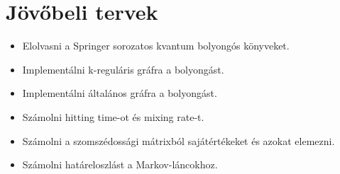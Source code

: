 \chapter{Jövőbeli tervek}

\begin{itemize}
  \item Elolvasni a Springer sorozatos kvantum bolyongós könyveket.
  \item Implementálni k-reguláris gráfra a bolyongást.
  \item Implementálni általános gráfra a bolyongást.
  \item Számolni hitting time-ot és mixing rate-t.
  \item Számolni a szomszédossági mátrixból sajátértékeket és azokat elemezni.
  \item Számolni határeloszlást a Markov-láncokhoz.
\end{itemize}